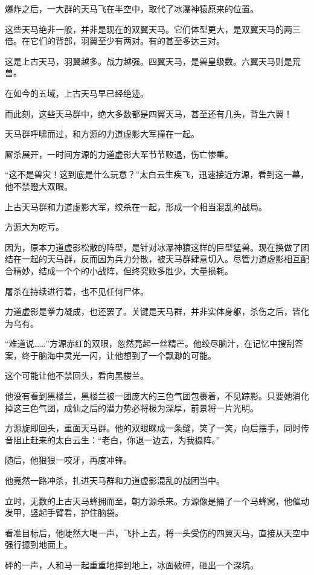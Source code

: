 \begin{this_body}
爆炸之后，一大群的天马飞在半空中，取代了冰瀑神猿原来的位置。

这些天马绝非一般，并非是现在的双翼天马。它们体型更大，是双翼天马的两三倍。在它们的背部，羽翼至少有两对。有的甚至多达三对。

这是上古天马，羽翼越多。战力越强。四翼天马，是兽皇级数。六翼天马则是荒兽。

在如今的五域，上古天马早已经绝迹。

而此刻，这些天马群中，绝大多数都是四翼天马，甚至还有几头，背生六翼！

天马群呼啸而过，和方源的力道虚影大军撞在一起。

厮杀展开，一时间方源的力道虚影大军节节败退，伤亡惨重。

“这不是兽灾！这到底是什么玩意？”太白云生疾飞，迅速接近方源，看到这一幕，他不禁瞪大双眼。

上古天马群和力道虚影大军，绞杀在一起，形成一个相当混乱的战局。

方源大为吃亏。

因为，原本力道虚影松散的阵型，是针对冰瀑神猿这样的巨型猛兽。现在换做了团结在一起的天马群，反而因为兵力分散，被天马群肆意切入。尽管力道虚影相互配合精妙，结成一个个的小战阵，但终究败多胜少，大量损耗。

屠杀在持续进行着，也不见任何尸体。

力道虚影是拳力凝成，也还罢了。关键是天马群，并非实体身躯，杀伤之后，皆化为乌有。

“难道说……”方源赤红的双眼，忽然亮起一丝精芒。他绞尽脑汁，在记忆中搜刮答案，终于脑海中灵光一闪，让他想到了一个飘渺的可能。

这个可能让他不禁回头，看向黑楼兰。

他没有看到黑楼兰，黑楼兰被一团庞大的三色气团包裹着，不见踪影。只要她消化掉这三色气团，成仙之后的潜力势必将极为深厚，前景将一片光明。

方源旋即回头，重面天马群。他的双眼眯成一条缝，笑了一笑，向后摆手，同时传音阻止赶来的太白云生：“老白，你退一边去，为我摄阵。”

随后，他狠狠一咬牙，再度冲锋。

他竟然一路冲杀，扎进天马群和力道虚影混乱的战团当中。

立时，无数的上古天马蜂拥而至，朝方源杀来。方源像是捅了一个马蜂窝，他催动发甲，竖起手臂看，护住脑袋。

看准目标后，他陡然大喝一声，飞扑上去，将一头受伤的四翼天马，直接从天空中强行摁到地面上。

砰的一声，人和马一起重重地摔到地上，冰面破碎，砸出一个深坑。


\end{this_body}

